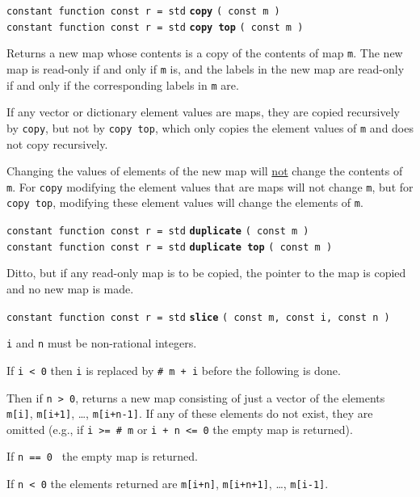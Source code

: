 \documentclass[12pt]{article}
\newcommand{\ttkey}[1]{{\tt \bfseries #1}}
\newenvironment{indpar}[1][0.3in]%
	{\begin{list}{}%
		     {\setlength{\itemsep}{0in}%
		      \setlength{\topsep}{0in}%
		      \setlength{\parsep}{1ex}%
		      \setlength{\labelwidth}{#1}%
		      \setlength{\leftmargin}{#1}%
		      \addtolength{\leftmargin}{\labelsep}}%
	 \item}%
	{\end{list}}
\begin{document}
{\tt constant function const r = std} \ttkey{copy} {\tt ( const m )} \\
{\tt constant function const r = std} \ttkey{copy top} {\tt ( const m )} %
\label{MAP-COPY}
\begin{indpar}
Returns a new map whose contents is a copy of the contents of
map {\tt m}.  The new map is read-only if and only if {\tt m} is,
and the labels in the new map are read-only if and only if the
corresponding labels in {\tt m} are.

If any vector or dictionary element values are maps, they are
copied recursively by {\tt copy}, but not by
{\tt copy top}, which only copies the element values of {\tt m}
and does not copy recursively.

Changing the values of elements of the new map will \underline{not} change
the contents of {\tt m}.  For {\tt copy} modifying the element values
that are maps will not change {\tt m}, but for {\tt copy top},
modifying these element values will change the elements of {\tt m}.

\end{indpar}

{\tt constant function const r = std} \ttkey{duplicate} {\tt ( const m )} \\
{\tt constant function const r = std} \ttkey{duplicate top} {\tt ( const m )}
\begin{indpar}
Ditto, but if any read-only map is to be copied, the pointer
to the map is copied and no new map is made.
\end{indpar}

{\tt constant function const r = std} \ttkey{slice}
    {\tt ( const m, const i, const n )}
\begin{indpar}
{\tt i} and {\tt n} must be non-rational integers.

If {\tt i < 0} then {\tt i} is replaced by {\tt \# m + i} before the
following is done.

Then if {\tt n > 0}, returns a new map consisting of just a vector of the
elements {\tt m[i]}, {\tt m[i+1]}, \ldots, {\tt m[i+n-1]}.  
If any of these elements do not exist, they are omitted (e.g.,
if {\tt i >= \# m} or {\tt i + n <= 0} the empty map is returned).

If {\tt n == 0 } the empty map is returned.

If {\tt n < 0} the elements returned are
{\tt m[i+n]}, {\tt m[i+n+1]}, \ldots, {\tt m[i-1]}.

\end{indpar}
\end{document}
